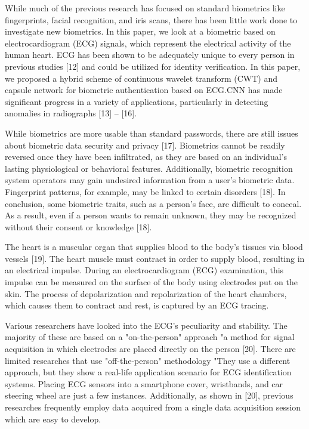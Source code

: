 \documentclass{standalone}
\begin{document}
While much of the previous research has focused on standard biometrics like fingerprints, facial recognition, and iris scans, there has been little work done to investigate new biometrics. In this paper, we look at a biometric based on electrocardiogram (ECG) signals, which represent the electrical activity of the human heart. ECG has been shown to be adequately unique to every person in previous studies [12] and could be utilized for identity verification. In this paper, we proposed a hybrid scheme of continuous wavelet transform (CWT) and capsule network for biometric authentication based on ECG.CNN has made significant progress in a variety of applications, particularly in detecting anomalies in radiographs [13] – [16]. 


While biometrics are more usable than standard passwords, there are still issues about biometric data security and privacy [17]. Biometrics cannot be readily reversed once they have been infiltrated, as they are based on an individual's lasting physiological or behavioral features. Additionally, biometric recognition system operators may gain undesired information from a user's biometric data. Fingerprint patterns, for example, may be linked to certain disorders [18]. In conclusion, some biometric traits, such as a person's face, are difficult to conceal. As a result, even if a person wants to remain unknown, they may be recognized without their consent or knowledge [18].

The heart is a muscular organ that supplies blood to the body's tissues via blood vessels [19]. The heart muscle must contract in order to supply blood, resulting in an electrical impulse. During an electrocardiogram (ECG) examination, this impulse can be measured on the surface of the body using electrodes put on the skin. The process of depolarization and repolarization of the heart chambers, which causes them to contract and rest, is captured by an ECG tracing.


Various researchers have looked into the ECG's peculiarity and stability. The majority of these are based on a "on-the-person" approach "a method for signal acquisition in which electrodes are placed directly on the person [20]. There are limited researches that use "off-the-person" methodology "They use a different approach, but they show a real-life application scenario for ECG identification systems. Placing ECG sensors into a smartphone cover, wristbands, and car steering wheel are just a few instances. Additionally, as shown in [20], previous researches frequently employ data acquired from a single data acquisition session which are easy to develop. 
\end{document}
